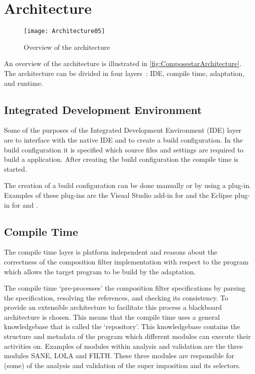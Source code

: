 \section{\Compose* Architecture}
\label{sec:TheComposestarArchitecture}
\begin{figure}[htbp]
  \centering
  \texttt{[image: Architecture05]}
  \caption[Overview of the \Compose* architecture]{%
    Overview of the \Compose* architecture}
  \label{fig:ComposestarArchitecture}
\end{figure}
An overview of the \Compose* architecture is illustrated in \autoref{fig:ComposestarArchitecture}.
The \Compose* architecture can be divided in four layers~\cite{Nagy2006}: IDE, compile time, adaptation, and runtime. 

\subsection{Integrated Development Environment}
Some of the purposes of the Integrated Development Environment (IDE) layer are to interface with the native IDE and to create a build configuration.
In the build configuration it is specified which source files and settings are required to build a \Compose* application.
After creating the build configuration the compile time is started.

The creation of a build configuration can be done manually or by using a plug-in.
Examples of these plug-ins are the Visual Studio add-in for \Compose*[.NET] and the Eclipse plug-in for \Compose*[J] and \Compose*[C].

\subsection{Compile Time}
The compile time layer is platform independent and reasons about the correctness of the composition filter implementation with respect to the program which allows the target program to be build by the adaptation.

The compile time `pre-processes' the composition filter specifications by parsing the specification, resolving the references, and checking its consistency.
To provide an extensible architecture to facilitate this process a blackboard architecture is chosen.
This means that the compile time uses a general knowledgebase that is called the `repository'.
This knowledgebase contains the structure and metadata of the program which different modules can execute their activities on.
Examples of modules within analysis and validation are the three modules SANE, LOLA and FILTH.
These three modules are responsible for (some) of the analysis and validation of the super imposition and its selectors.

